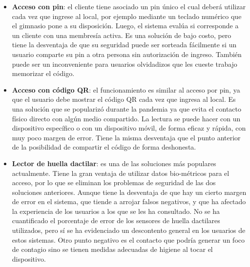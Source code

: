  \begin{itemize}
     \item \textbf{Acceso con pin}: el cliente tiene asociado un pin único el cual deberá utilizar cada vez que ingrese al local, por ejemplo mediante un teclado numérico que el gimnasio pone a su disposición. Luego, el sistema evalúa si corresponde a un cliente con una membresía activa. Es una solución de bajo costo, pero tiene la desventaja de que su seguridad puede ser sorteada fácilmente si un usuario comparte su pin a otra persona sin autorización de ingreso. También puede ser un inconveniente para usuarios olvidadizos que les cueste trabajo memorizar el código.
     
     \item \textbf{Acceso con código QR}: el funcionamiento es similar al acceso por pin, ya que el usuario debe mostrar el código QR cada vez que ingresa al local. Es una solución que se popularizó durante la pandemia ya que evita el contacto físico directo con algún medio compartido. La lectura se puede hacer con un dispositivo específico o con un dispositivo móvil, de forma eficaz y rápida, con muy poco margen de error. Tiene la misma desventaja que el punto anterior de la posibilidad de compartir el código de forma deshonesta.
     
     \item \textbf{Lector de huella dactilar}: es una de las soluciones más populares actualmente. Tiene la gran ventaja de utilizar datos bio-métricos para el acceso, por lo que se eliminan los problemas de seguridad de las dos soluciones anteriores. Aunque tiene la desventaja de que hay un cierto margen de error en el sistema, que tiende a arrojar falsos negativos, y que ha afectado la experiencia de los usuarios a los que se les ha consultado. No se ha cuantificado el porcentaje de error de los sensores de huella dactilares utilizados, pero sí se ha evidenciado un descontento general en los usuarios de estos sistemas. Otro punto negativo es el contacto que podría generar un foco de contagio sino se tienen medidas adecuadas de higiene al tocar el dispositivo.
     

\end{itemize}
